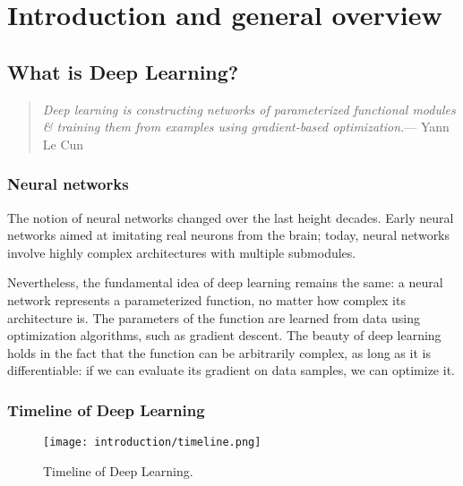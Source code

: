 \section{Introduction and general overview}
\subsection{What is Deep Learning?}
\begin{quotation}
    \textit{Deep learning is constructing networks of parameterized functional modules \& training them from examples using gradient-based optimization.}\hfill--- Yann Le Cun
\end{quotation}

\subsubsection{Neural networks}
The notion of neural networks changed over the last height decades. Early neural networks aimed at imitating real neurons from the brain; today, neural networks involve highly complex architectures with multiple submodules.

Nevertheless, the fundamental idea of deep learning remains the same: a neural network represents a parameterized function, no matter how complex its architecture is. The parameters of the function are learned from data using optimization algorithms, such as gradient descent. The beauty of deep learning holds in the fact that the function can be arbitrarily complex, as long as it is differentiable: if we can evaluate its gradient on data samples, we can optimize it.

\subsubsection{Timeline of Deep Learning}
\begin{figure}[H]
    \centering
    \texttt{[image: introduction/timeline.png]}
    \caption{Timeline of Deep Learning.}
\end{figure}

